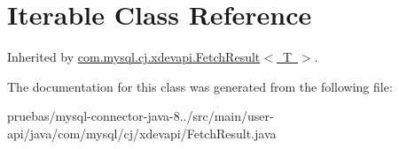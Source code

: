\hypertarget{class_iterable}{}\section{Iterable Class Reference}
\label{class_iterable}


Inherited by \mbox{\hyperlink{interfacecom_1_1mysql_1_1cj_1_1xdevapi_1_1_fetch_result}{com.\+mysql.\+cj.\+xdevapi.\+Fetch\+Result$<$ T $>$}}.



The documentation for this class was generated from the following file\+:\begin{DoxyCompactItemize}
\item 
pruebas/mysql-\/connector-\/java-\/8../src/main/user-\/api/java/com/mysql/cj/xdevapi/Fetch\+Result.\+java\end{DoxyCompactItemize}

